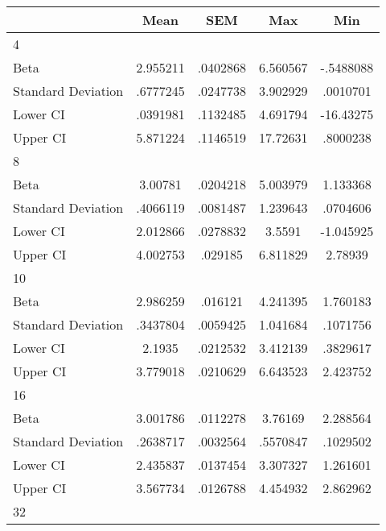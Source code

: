 {
\def\sym#1{\ifmmode^{#1}\else\(^{#1}\)\fi}
\begin{tabular}{l*{1}{cccc}}
\hline\hline
                    &        Mean&         SEM&         Max&         Min\\
\hline
4                   &            &            &            &            \\
Beta                &    2.955211&    .0402868&    6.560567&   -.5488088\\
Standard Deviation  &    .6777245&    .0247738&    3.902929&    .0010701\\
Lower CI            &    .0391981&    .1132485&    4.691794&   -16.43275\\
Upper CI            &    5.871224&    .1146519&    17.72631&    .8000238\\
\hline
8                   &            &            &            &            \\
Beta                &     3.00781&    .0204218&    5.003979&    1.133368\\
Standard Deviation  &    .4066119&    .0081487&    1.239643&    .0704606\\
Lower CI            &    2.012866&    .0278832&      3.5591&   -1.045925\\
Upper CI            &    4.002753&     .029185&    6.811829&     2.78939\\
\hline
10                  &            &            &            &            \\
Beta                &    2.986259&     .016121&    4.241395&    1.760183\\
Standard Deviation  &    .3437804&    .0059425&    1.041684&    .1071756\\
Lower CI            &      2.1935&    .0212532&    3.412139&    .3829617\\
Upper CI            &    3.779018&    .0210629&    6.643523&    2.423752\\
\hline
16                  &            &            &            &            \\
Beta                &    3.001786&    .0112278&     3.76169&    2.288564\\
Standard Deviation  &    .2638717&    .0032564&    .5570847&    .1029502\\
Lower CI            &    2.435837&    .0137454&    3.307327&    1.261601\\
Upper CI            &    3.567734&    .0126788&    4.454932&    2.862962\\
\hline
32                  &            &            &            &            \\

\end{tabular}}
